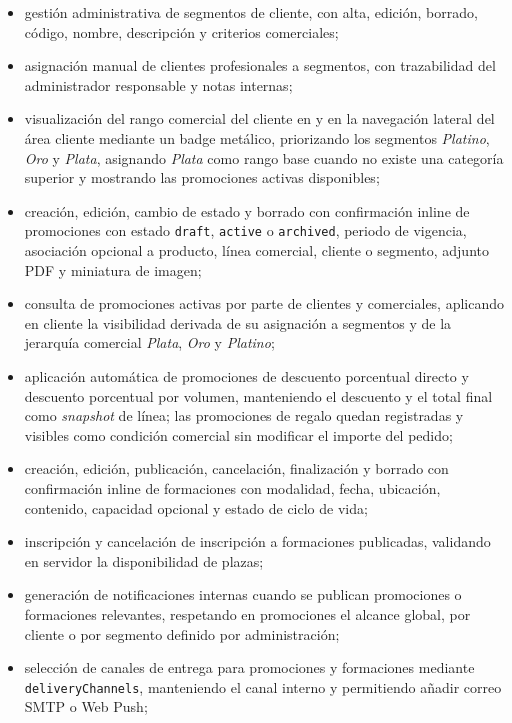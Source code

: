 \begin{itemize}
    \item gestión administrativa de segmentos de cliente, con alta, edición, borrado, código, nombre, descripción y criterios comerciales;
    \item asignación manual de clientes profesionales a segmentos, con trazabilidad del administrador responsable y notas internas;
    \item visualización del rango comercial del cliente en  y en la navegación lateral del área cliente mediante un badge metálico, priorizando los segmentos \textit{Platino}, \textit{Oro} y \textit{Plata}, asignando \textit{Plata} como rango base cuando no existe una categoría superior y mostrando las promociones activas disponibles;
    \item creación, edición, cambio de estado y borrado con confirmación inline de promociones con estado \texttt{draft}, \texttt{active} o \texttt{archived}, periodo de vigencia, asociación opcional a producto, línea comercial, cliente o segmento, adjunto PDF y miniatura de imagen;
    \item consulta de promociones activas por parte de clientes y comerciales, aplicando en cliente la visibilidad derivada de su asignación a segmentos y de la jerarquía comercial \textit{Plata}, \textit{Oro} y \textit{Platino};
    \item aplicación automática de promociones de descuento porcentual directo y descuento porcentual por volumen, manteniendo el descuento y el total final como \textit{snapshot} de línea; las promociones de regalo quedan registradas y visibles como condición comercial sin modificar el importe del pedido;
    \item creación, edición, publicación, cancelación, finalización y borrado con confirmación inline de formaciones con modalidad, fecha, ubicación, contenido, capacidad opcional y estado de ciclo de vida;
    \item inscripción y cancelación de inscripción a formaciones publicadas, validando en servidor la disponibilidad de plazas;
    \item generación de notificaciones internas cuando se publican promociones o formaciones relevantes, respetando en promociones el alcance global, por cliente o por segmento definido por administración;
    \item selección de canales de entrega para promociones y formaciones mediante \texttt{deliveryChannels}, manteniendo el canal interno y permitiendo añadir correo SMTP o Web Push;

\end{itemize}
